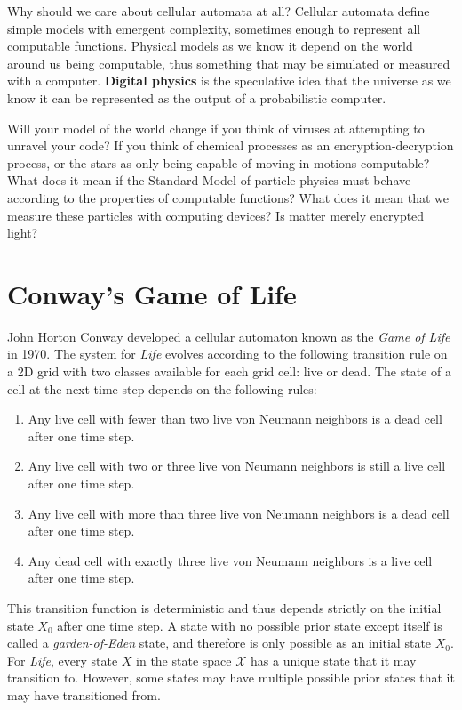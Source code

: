 \documentclass[10pt, a5paper, twoside, openright]{memoir}
\begin{document}
Why should we care about cellular automata at all? Cellular automata define simple models with emergent complexity, sometimes enough to represent all computable functions. Physical models as we know it depend on the world around us being computable, thus something that may be simulated or measured with a computer. \textbf{Digital physics} is the speculative idea that the universe as we know it can be represented as the output of a probabilistic computer.

Will your model of the world change if you think of viruses at attempting to unravel your code? If you think of chemical processes as an encryption-decryption process, or the stars as only being capable of moving in motions computable? What does it mean if the Standard Model of particle physics must behave according to the properties of computable functions? What does it mean that we measure these particles with computing devices? Is matter merely encrypted light?

\section{Conway's Game of Life}
John Horton Conway developed a cellular automaton known as the \textit{Game of Life} in 1970. The system for \textit{Life} evolves according to the following transition rule on a 2D grid with two classes available for each grid cell: live or dead. The state of a cell at the next time step depends on the following rules:
\begin{enumerate}
\item Any live cell with fewer than two live von Neumann neighbors is a dead cell after one time step.
\item Any live cell with two or three live von Neumann neighbors is still a live cell after one time step.
\item Any live cell with more than three live von Neumann neighbors is a dead cell after one time step.
\item Any dead cell with exactly three live von Neumann neighbors is a live cell after one time step.
\end{enumerate}
This transition function is deterministic and thus depends strictly on the initial state $X_0$ after one time step. A state with no possible prior state except itself is called a \textit{garden-of-Eden} state, and therefore is only possible as an initial state $X_0$. For \textit{Life}, every state $X$ in the state space $\mathcal X$ has a unique state that it may transition to. However, some states may have multiple possible prior states that it may have transitioned from.
\end{document}

